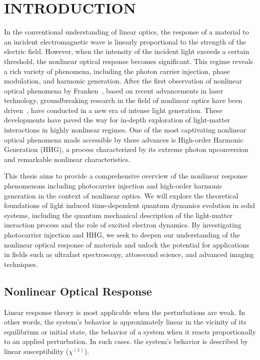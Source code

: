 

\chapter{INTRODUCTION }
\label{ch:introduction}
In the conventional understanding of linear optics, the response of a material to an incident
electromagnetic wave is linearly proportional to the strength of the electric field. However, when
the intensity of the incident light exceeds a certain threshold, the nonlinear optical response
becomes significant. This regime reveals a rich variety of phenomena, including the photon carrier
injection, phase modulation, and harmonic generation.
After the first observation of nonlinear optical phenomena by Franken~\cite{franken1961generation},
based on recent advancements in laser technology, groundbreaking research in the field of nonlinear
optics have been driven~\cite{RevModPhys.72.545, RevModPhys.81.163, MOUROU2012720}, have conducted in a new era of intense light generation. These developments have paved the way for in-depth exploration of light-matter interactions in highly nonlinear regimes. One of the most captivating nonlinear optical phenomena made accessible by these advances is High-order Harmonic Generation (\gls{HHG}), a process characterized by its extreme photon upconversion and remarkable nonlinear characteristics.

This thesis aims to provide a comprehensive overview of the nonlinear response phenomenons
including photocarrier injection and high-order harmonic generation in the context of nonlinear
optics. We will explore the theoretical foundations of light induced time-dependent quantum
dynamics evolution in solid systems,
including the quantum mechanical description of the light-matter ineraction process and the role of
excited electron dynamics.  By investigating photocarrier injection and HHG, we seek to deepen our understanding of the nonlinear optical response of materials and unlock the potential for applications in fields such as ultrafast spectroscopy, attosecond science, and advanced imaging techniques.
\section{Nonlinear Optical Response}
Linear response theory is most applicable when the perturbations are weak. In other words, the system's behavior is approximately linear in the vicinity of its equilibrium or initial state, the behavior of a system when it reacts proportionally to an applied perturbation.
In such cases. the system's behavior is described by linear susceptibility ($\chi^{(1)}$).

